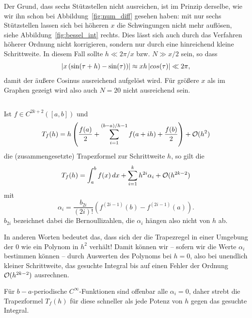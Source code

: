 Der Grund, dass sechs Stützstellen nicht ausreichen, ist im Prinzip
derselbe, wie wir ihn schon bei Abbildung~\ref{fig:num_diff} gesehen
haben: mit nur sechs Stützstellen lassen sich bei höheren $x$ die
Schwingungen nicht mehr auflösen, siehe Abbildung~\ref{fig:bessel_int}
rechts. Dies lässt sich auch durch das Verfahren höherer Ordnung nicht
korrigieren, sondern nur durch eine hinreichend kleine
Schrittweite. In diesem Fall sollte $h \ll 2\pi/x$ bzw. $N \gg x/2$
sein, so dass
\begin{equation}
  \left\lvert{x\left(\sin(\tau + h) - \sin(\tau)\right)}\right\rvert \approx x h
  \left\lvert{cos(\tau)}\right\rvert \ll 2\pi,
\end{equation}
damit der äußere Cosinus ausreichend aufgelöst wird.  Für größere $x$
als im Graphen gezeigt wird also auch $N=20$ nicht ausreichend sein.

\subsection{}

Ist $f\in C^{2k+2}([a,b])$ und
\begin{equation}
  T_f(h) = h\left(\frac{f(a)}{2} + \sum_{i=1}^{(b-a)/h - 1} f(a + i h) +
    \frac{f(b)}{2}\right) + \mathcal O(h^2)
\end{equation}
die (zusammengesetzte) Trapezformel zur Schrittweite $h$, so gilt die
\emph{}
\begin{equation}
  T_f(h) = \int_a^b f(x)\,dx + \sum_{i=1}^k h^{2i}\alpha_i + \mathcal O(h^{2k-2})
\end{equation}
mit
\begin{equation}
  \alpha_i = \frac{b_{2i}}{(2i)!}\left(f^{(2i-1)}(b) - f^{(2i-1)}(a)\right).
\end{equation}
$b_{2i}$ bezeichnet dabei die Bernoullizahlen, die $\alpha_i$ hängen also
nicht von $h$ ab. 

In anderen Worten bedeutet das, dass sich der die Trapezregel in einer
Umgebung der 0 wie ein Polynom in $h^2$ verhält!  Damit können wir --
sofern wir die Werte $\alpha_i$ bestimmen können -- durch Auswerten
des Polynoms bei $h=0$, also bei unendlich kleiner Schrittweite, das
gesuchte Integral bis auf einen Fehler der Ordnung $\mathcal O(h^{2k-2})$
ausrechnen.

Für $b-a$-periodische $C^\infty$-Funktionen sind offenbar alle
$\alpha_i=0$, daher strebt die Trapezformel $T_f(h)$ für diese
schneller als jede Potenz von $h$ gegen das gesuchte Integral.

